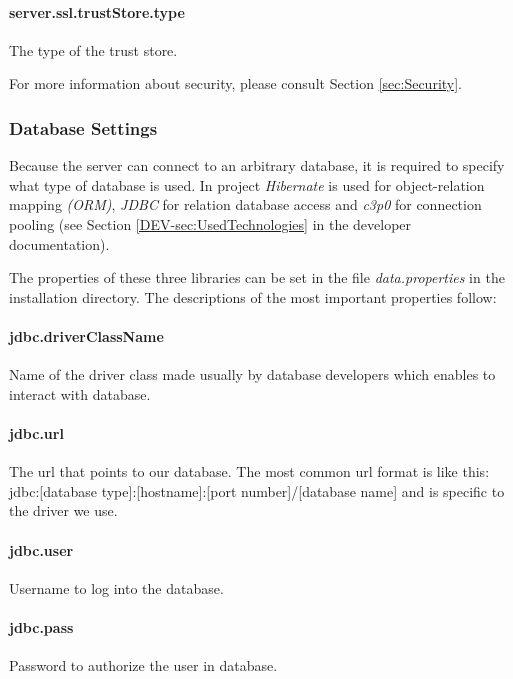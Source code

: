 \paragraph{server.ssl.trustStore.type}
The type of the trust store.

\vspace{0.75cm}
For more information about security, please consult Section \ref{sec:Security}.

\subsubsection{Database Settings}
\label{sssec:DataSettings}

Because the server can connect to an arbitrary database, it is required to
specify what type of database is used. In \textan{} project \emph{Hibernate}
is used for object-relation mapping \emph{(ORM)}, \emph{JDBC} for relation
database access and \emph{c3p0} for connection pooling (see Section
\ref{DEV-sec:UsedTechnologies} in the developer documentation).

The properties of these three libraries can be set in the file
\emph{data.properties} in the installation directory. The descriptions of the
most important properties follow:

\paragraph{jdbc.driverClassName}
Name of the driver class made usually by database developers which enables to
interact with database.

\paragraph{jdbc.url}
 The url that points to our database. The most common url format is like this:
jdbc:[database type]:[hostname]:[port number]/[database name]
and is specific to the driver we use.

\paragraph{jdbc.user}
Username to log into the database.

\paragraph{jdbc.pass}
Password to authorize the user in database.

